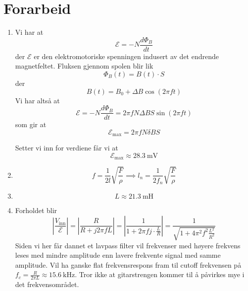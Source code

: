 \documentclass[a4paper,11pt,norsk]{article}
\begin{document}


\section*{Forarbeid}
\begin{enumerate}
    \item Vi har at
        \[
            \mathcal{E} = -N\frac{d\Phi_{B}}{dt}
        \]
        der $\mathcal{E}$ er den elektromotoriske spenningen indusert av det endrende magnetfeltet.
        Fluksen gjennom spolen blir lik
        \[
            \Phi_{B}(t) = B(t) \cdot S
        \]
        der 
        \[
            B(t) = B_0 + \Delta B\cos(2\pi f t)
        \]
        Vi har altså at 
        \[
            \mathcal{E} = -N\frac{d\Phi_{B}}{dt} = 2\pi f N \Delta B S \sin(2\pi f t)
        \]
        som gir at 
        \[
            \mathcal{E}_{\text{max}} = 2\pi f N \delta B S
        \]

        Setter vi inn for verdiene får vi at
        \[
            \mathcal{E}_{\text{max}} \approx \SI{28.3}{\milli\volt}
        \]

    \item 
        \[
            f = \frac{1}{2l}\sqrt{\frac{F}{\rho}} \implies l_n = \frac{1}{2f_n}\sqrt{\frac{F}{\rho}}
        \]

    \item 
        \[
            L \approx \SI{21.3}{\milli\henry}
        \]

    \item Forholdet blir 
        \[
            \left|\frac{V_{\text{inn}}}{\mathcal{E}}\right| = \left|\frac{R}{R + j 2\pi f L}\right| = \left|\frac{1}{1 + 2\pi fj \cdot \frac{L}{R}}\right| = \frac{1}{\sqrt{1 + 4\pi^2 f^2 \frac{L^2}{R^2}}}
        \]
        Siden vi her får dannet et lavpass filter vil frekvenser med høyere frekvens leses med mindre amplitude enn lavere frekvente signal med samme
        amplitude. Vil ha ganske flat frekvensrespons fram til cutoff frekvensen på $f_c = \frac{R}{2\pi L} \approx \SI{15.6}{\kilo\hertz}$.
        Tror ikke at gitarstrengen kommer til å påvirkes mye i det frekvensområdet.

\end{enumerate}
\end{document}
